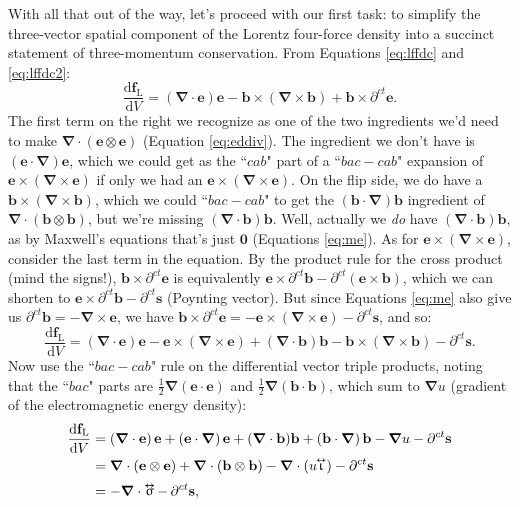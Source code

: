 \documentclass[12pt]{article}
\renewcommand{\vv}[1]{\mathbf{#1}}
\newcommand{\dd}[1]{\mathrm{d}#1}
\newcommand{\del}{\boldsymbol{\nabla}}
\newcommand{\tightoverset}[2]{%
  \mathop{#2}\limits^{\vbox to -.5ex{\kern-0.75ex\hbox{$#1$}\vss}}}
\newcommand{\inlinedy}[1]{\tightoverset{\text{\tiny$\bm\leftrightarrow$}}{#1}}
\begin{document}
With all that out of the way, let's proceed with our first task: to simplify the three-vector spatial component of the Lorentz four-force density into a succinct statement of three-momentum conservation. From Equations \ref{eq:lffdc} and \ref{eq:lffdc2}:
\begin{equation*}
\dfrac{\dd \vv f_{\mathrm{L}}}{\dd V} = \left( \del \cdot \vv e \right) \vv e - \vv b \times \left( \del \times \vv b \right) + \vv b \times \partial^{ct} \vv e .
\end{equation*}
The first term on the right we recognize as one of the two ingredients we'd need to make $\del \cdot (\vv e \otimes \vv e)$ (Equation \ref{eq:eddiv}). The ingredient we don't have is $(\vv e \cdot \del) \vv e$, which we could get as the ``$cab$" part of a ``$bac - cab$" expansion of $\vv e \times (\del \times \vv e)$ if only we had an $\vv e \times (\del \times \vv e)$. On the flip side, we do have a $\vv b \times (\del \times \vv b)$, which we could ``$bac - cab$" to get the $(\vv b \cdot \del) \vv b$ ingredient of $\del \cdot (\vv b \otimes \vv b)$, but we're missing $(\del \cdot \vv b) \vv b$. Well, actually we \emph{do} have $(\del \cdot \vv b) \vv b$, as by Maxwell's equations that's just $\vv 0$ (Equations \ref{eq:me}). As for $\vv e \times (\del \times \vv e)$, consider the last term in the equation. By the product rule for the cross product (mind the signs!), $\vv b \times \partial^{ct} \vv e$ is equivalently $\vv e \times \partial^{ct} \vv b - \partial^{ct} \left( \vv e \times \vv b \right)$, which we can shorten to $\vv e \times \partial^{ct} \vv b - \partial^{ct} \vv s$ (Poynting vector). But since Equations \ref{eq:me} also give us $\partial^{ct} \vv b = - \del \times \vv e$, we have $\vv b \times \partial^{ct} \vv e = - \vv e \times (\del \times \vv e) - \partial^{ct} \vv s$, and so:
\begin{equation*}
\dfrac{\dd \vv f_{\mathrm{L}}}{\dd V} = \left( \del \cdot \vv e \right) \vv e - \vv e \times (\del \times \vv e) + (\del \cdot \vv b) \vv b - \vv b \times \left( \del \times \vv b \right) - \partial^{ct} \vv s .
\end{equation*}
Now use the ``$bac - cab$" rule on the differential vector triple products, noting that the ``$bac$" parts are $\frac{1}{2} \del (\vv e \cdot \vv e)$ and $\frac{1}{2} \del (\vv b \cdot \vv b)$, which sum to $\del u$ (gradient of the electromagnetic energy density):
\begin{equation*}
\begin{aligned}
\dfrac{\dd \vv f_{\mathrm{L}}}{\dd V} &= \left( \del \cdot \vv e \right) \vv e + \left( \vv e \cdot \del \right) \vv e + (\del \cdot \vv b) \vv b + \left( \vv b \cdot \del \right) \vv b - \del u - \partial^{ct} \vv s \\
&= \del \cdot (\vv e \otimes \vv e) + \del \cdot (\vv b \otimes \vv b) - \del \cdot (u \mkern-4.5mu \inlinedy{\upiota}) - \partial^{ct} \vv s \\[2pt]
&= - \del \cdot \inlinedy{\upsigma} - \, \partial^{ct} \vv s ,
\end{aligned}
\end{equation*}
\end{document}
